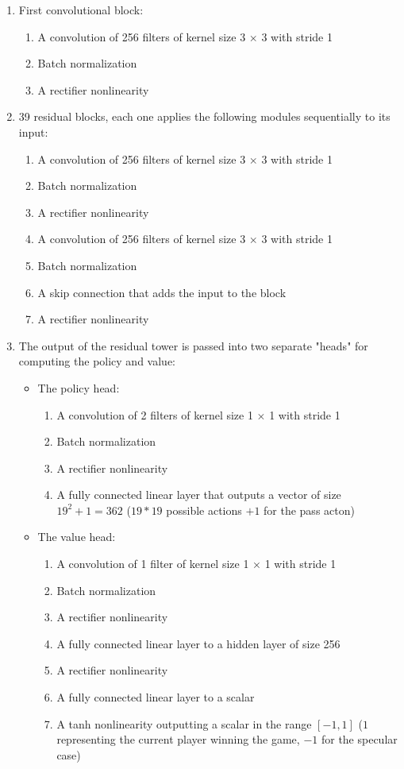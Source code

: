 \documentclass{article}
\begin{document}
\begin{enumerate}
	\item First convolutional block:
	\begin{enumerate}
		\item A convolution of 256 filters of kernel size 3 $\times$ 3 with stride 1
		\item Batch normalization
		\item A rectifier nonlinearity
	\end{enumerate}
	\item  39 residual blocks, each one applies the following modules sequentially to its input:
	\begin{enumerate}
		\item A convolution of 256 filters of kernel size 3 $\times$ 3 with stride 1
		\item Batch normalization
		\item A rectifier nonlinearity
		\item A convolution of 256 filters of kernel size 3 $\times$ 3 with stride 1
		\item Batch normalization
		\item A skip connection that adds the input to the block
		\item A rectifier nonlinearity
	\end{enumerate}
	\item The output of the residual tower is passed into two separate "heads" for computing the policy and value:
	\begin{itemize}
		\item The policy head:
		
		\begin{enumerate}
			\item A convolution of 2 filters of kernel size 1 $\times$ 1 with stride 1
			\item Batch normalization
			\item A rectifier nonlinearity
			\item A fully connected linear layer that outputs a vector of size $19^2 + 1 = 362$ ($19*19$ possible actions $+1$ for the pass acton)
		\end{enumerate}
		
		\item The value head:
		
		\begin{enumerate}
			\item A convolution of 1 filter of kernel size 1 $\times$ 1 with stride 1
			\item Batch normalization
			\item A rectifier nonlinearity
			\item A fully connected linear layer to a hidden layer of size 256
			\item A rectifier nonlinearity
			\item A fully connected linear layer to a scalar
			\item A tanh nonlinearity outputting a scalar in the range $[-1, 1]$ ($1$ representing the current player winning the game, $-1$ for the specular case)
		\end{enumerate}
	\end{itemize}
	

\end{enumerate}
\end{document}
